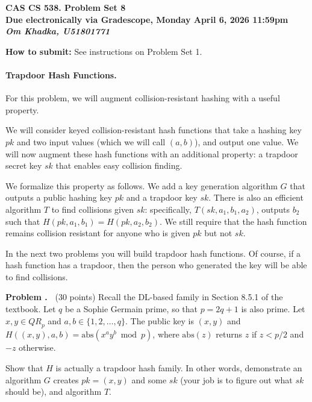 \documentclass[12pt]{article}
\newif\ifsol
\theoremstyle{definition}
\newcommand{\addbigskip}{\addvspace{\bigskipamount}}
\newcounter{problemnum}
\newenvironment{problem}
     {\addbigskip \setcounter{partnum}{0}
      \noindent\stepcounter{problemnum}\textbf{Problem
                                             \arabic{problemnum}.\ }}
     {\par\addbigskip}
\newcounter{partnum}
\newcommand{\pk}{\mathit{pk}}
\newcommand{\sk}{\mathit{sk}}
\newcommand{\qrp}{\mathit{QR}_p}
\begin{document}
\begin{center}
\Large{\textbf{CAS CS 538.  \ifsol Solutions to \fi Problem Set 8}}\\
\smallskip
\large{\textbf{Due electronically via Gradescope, Monday April 6, 2026 11:59pm}}\\
\large{\textbf{\textit{Om Khadka, U51801771}}}
\end{center}

\noindent
\textbf{How to submit:}  See instructions on Problem Set 1. 
 


 \paragraph{Trapdoor Hash Functions.}


 \noindent
For this problem, we will augment collision-resistant hashing with a useful property.
 
We will consider keyed collision-resistant hash functions that take a hashing key $\pk$ and two input values (which we will call $(a, b)$), and output one value. We will now augment these hash functions with an additional property: a trapdoor secret key $\sk$ that enables easy collision finding. 

We formalize this property as follows. We add a key generation algorithm
 $G$ that outputs a public hashing key $\pk$ and a trapdoor key $\sk$. There is also an efficient algorithm
 $T$ to find collisions given $\sk$: specifically,  $T(\sk, a_1, b_1, a_2)$, outputs $b_2$ such
 that $H(\pk, a_1, b_1)=H(\pk, a_2, b_2)$.  We still require that the hash function remains collision resistant for anyone who is given $\pk$ but not $\sk$.


 In the next two problems you will build trapdoor hash functions. Of course, if a hash function has a trapdoor, then the person who generated the key will be able to find collisions.
 
 \begin{problem} (30 points) \label{dltrapdoor}
Recall the DL-based family in Section 8.5.1 of the textbook. Let $q$ be a Sophie Germain prime, so that $p=2q+1$ is also prime. Let  $x, y\in\qrp$ and $a, b\in \{1, 2, \dots, q\}$. The public key is $(x, y)$ and $H((x, y), a, b)=\mathrm{abs} (x^a y^b\bmod p)$, where $\mathrm{abs}(z)$ returns $z$ if $z<p/2$ and $-z$ otherwise.

Show that $H$ is actually a trapdoor hash
 family.  In other words, demonstrate an algorithm $G$ creates $\pk=(x, y)$ and some $\sk$ (your job is to figure out what $\sk$ should be), and algorithm $T$.
 \end{problem}
\end{document}

